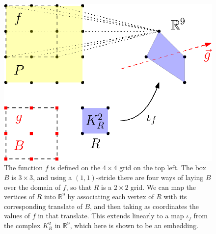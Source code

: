 \documentclass[conference]{IEEEtran}
\theoremstyle{definition}
\numberwithin{figure}{section}
\begin{document}
\begin{figure}
	\includegraphics{embedding}
	\caption{The function $f$ is defined on the $4 \times 4$ grid on the top left. The box $B$ is $3 \times 3$, and using a $(1,1)$-stride there are four ways of laying $B$ over the domain of $f$, so that $R$ is a $2 \times 2$ grid. We can map the vertices of $R$ into $\mathbb{R}^9$ by associating each vertex of $R$ with its corresponding translate of $B$, and then taking as coordinates the values of $f$ in that translate. This extends linearly to a map $\iota_{f}$ from the complex $K_{R}^2$ in $\mathbb{R}^9$, which here is shown to be an embedding.}
	\label{fig:embedding}
\end{figure}
\end{document}
